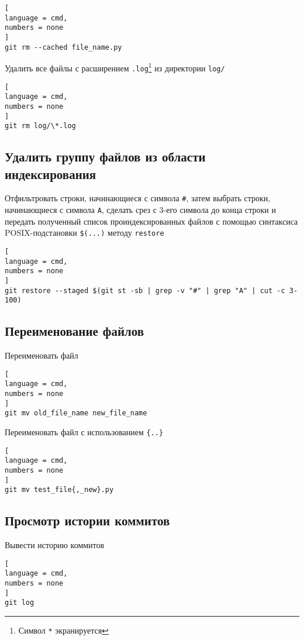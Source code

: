 \documentclass[%
	11pt,
	a4paper,
	utf8,
		]{article}
\begin{document}
\begin{lstlisting}[
language = cmd,
numbers = none
]
git rm --cached file_name.py
\end{lstlisting}


Удалить все файлы с расширением \texttt{.log}\footnote{Символ \texttt{*} экранируется} из директории \texttt{log/}

\begin{lstlisting}[
language = cmd,
numbers = none
]
git rm log/\*.log
\end{lstlisting}

\subsection{Удалить группу файлов из области индексирования}

Отфильтровать строки, начинающиеся с символа \verb*|#|, затем выбрать строки, начинающиеся с символа \verb|A|, сделать срез с 3-его символа до конца строки и передать полученный список проиндексированных файлов с помощью синтаксиса POSIX-подстановки \verb*|$(...)| методу \verb*|restore|

\begin{lstlisting}[
language = cmd,
numbers = none
]
git restore --staged $(git st -sb | grep -v "#" | grep "A" | cut -c 3-100)
\end{lstlisting}

\subsection{Переименование файлов}

Переименовать файл

\begin{lstlisting}[
language = cmd,
numbers = none
]
git mv old_file_name new_file_name
\end{lstlisting}


Переименовать файл с использованием \texttt{\{..\}}
\begin{lstlisting}[
language = cmd,
numbers = none
]
git mv test_file{,_new}.py
\end{lstlisting}


\subsection{Просмотр истории коммитов}

Вывести историю коммитов

\begin{lstlisting}[
language = cmd,
numbers = none
]
git log
\end{lstlisting}
\end{document}
